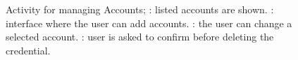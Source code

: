 \begin{figure}[!htb]
\centering
{}
\qquad
{}
\qquad
{}
\qquad
{}
\caption[Activity for managing Accounts]{Activity for managing Accounts; \protect{}: listed accounts are shown. \protect{}: interface where the user can add accounts. \protect{}: the user can change a selected account. \protect{}: user is asked to confirm before deleting the credential.}
\label{fig:accountactivity}
\end{figure}

